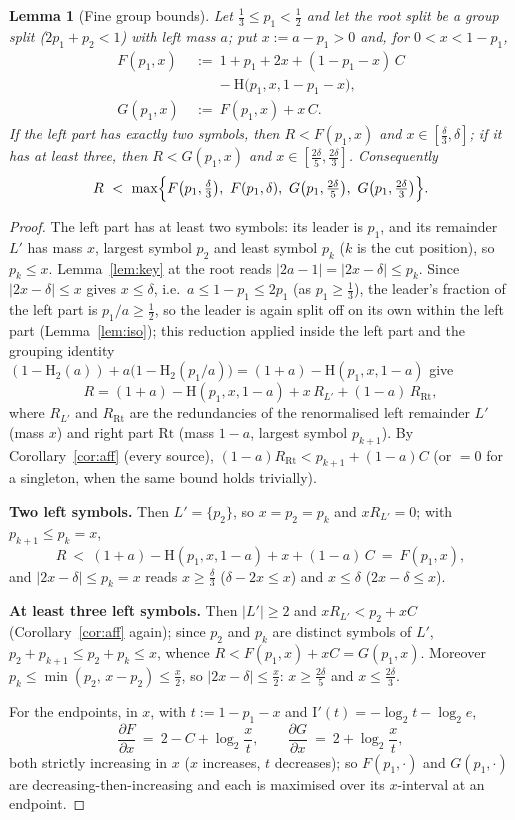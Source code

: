 \documentclass[journal]{IEEEtran}
\newtheorem{lemma}{Lemma}
\theoremstyle{definition}
\newcommand{\Hh}{\mathrm H_2}
\newcommand{\lgg}{\log_2}
\newcommand{\CC}{C}
\begin{document}
\begin{lemma}[Fine group bounds]\label{lem:fine}
Let $\tfrac13\le p_1<\tfrac12$ and let the root split be a group split
($2p_1+p_2<1$) with left mass $a$; put $x:=a-p_1>0$ and, for $0<x<1-p_1$,
\[
\begin{aligned}
  F(p_1,x)\ &:=\ 1+p_1+2x+(1-p_1-x)\,\CC\\
  &\phantom{{}:={}}-\mathrm H\bigl(p_1,x,1-p_1-x\bigr),\\
  G(p_1,x)\ &:=\ F(p_1,x)+x\,\CC .
\end{aligned}
\]
If the left part has exactly two symbols, then $R<F(p_1,x)$ and
$x\in[\tfrac\delta3,\delta]$; if it has at least three, then $R<G(p_1,x)$ and
$x\in[\tfrac{2\delta}5,\tfrac{2\delta}3]$. Consequently
\[
  R\ <\ \max\Bigl\{F\bigl(p_1,\tfrac\delta3\bigr),\ F(p_1,\delta),\
  G\bigl(p_1,\tfrac{2\delta}5\bigr),\ G\bigl(p_1,\tfrac{2\delta}3\bigr)\Bigr\}.
\]
\end{lemma}

\begin{proof}
The left part has at least two symbols: its leader is $p_1$, and its remainder
$L'$ has mass $x$, largest symbol $p_2$ and least symbol $p_k$ ($k$ is the cut
position), so $p_k\le x$. Lemma~\ref{lem:key} at the root reads
$|2a-1|=|2x-\delta|\le p_k$. Since $|2x-\delta|\le x$ gives $x\le\delta$,
i.e.\ $a\le1-p_1\le2p_1$ (as $p_1\ge\tfrac13$), the leader's fraction of the
left part is $p_1/a\ge\tfrac12$, so the leader is again split off on its own within the left part
(Lemma~\ref{lem:iso}); this reduction applied inside the left part and the
grouping identity
$(1-\Hh(a))+a\bigl(1-\Hh(p_1/a)\bigr)=(1+a)-\mathrm H(p_1,x,1-a)$ give
\[
  R=(1+a)-\mathrm H(p_1,x,1-a)+x\,R_{L'}+(1-a)\,R_{\mathrm{Rt}},
\]
where $R_{L'}$ and $R_{\mathrm{Rt}}$ are the redundancies of the renormalised left remainder $L'$ (mass $x$) and right part $\mathrm{Rt}$ (mass $1-a$, largest symbol $p_{k+1}$). By
Corollary~\ref{cor:aff} (every source),
$(1-a)R_{\mathrm{Rt}}<p_{k+1}+(1-a)\CC$ (or $=0$ for a singleton, when the
same bound holds trivially).

\textbf{Two left symbols.} Then $L'=\{p_2\}$, so $x=p_2=p_k$ and $xR_{L'}=0$;
with $p_{k+1}\le p_k=x$,
\[
  R\ <\ (1+a)-\mathrm H(p_1,x,1-a)+x+(1-a)\,\CC\ =\ F(p_1,x),
\]
and $|2x-\delta|\le p_k=x$ reads $x\ge\tfrac\delta3$
\textup{(}$\delta-2x\le x$\textup{)} and $x\le\delta$
\textup{(}$2x-\delta\le x$\textup{)}.

\textbf{At least three left symbols.} Then $|L'|\ge2$ and $xR_{L'}<p_2+x\CC$
(Corollary~\ref{cor:aff} again); since $p_2$ and $p_k$ are distinct symbols of
$L'$, $p_2+p_{k+1}\le p_2+p_k\le x$, whence $R<F(p_1,x)+x\CC=G(p_1,x)$.
Moreover $p_k\le\min(p_2,\,x-p_2)\le\tfrac x2$, so $|2x-\delta|\le\tfrac x2$:
$x\ge\tfrac{2\delta}5$ and $x\le\tfrac{2\delta}3$.

For the endpoints, in $x$, with $t:=1-p_1-x$ and $\mathrm I'(t)=-\lgg t-\lgg e$,
\[
  \frac{\partial F}{\partial x}\ =\ 2-\CC+\lgg\frac{x}{t},
  \qquad
  \frac{\partial G}{\partial x}\ =\ 2+\lgg\frac{x}{t},
\]
both strictly increasing in $x$ ($x$ increases, $t$ decreases); so
$F(p_1,\cdot)$ and $G(p_1,\cdot)$ are decreasing-then-increasing and each is
maximised over its $x$-interval at an endpoint.
\end{proof}
\end{document}
